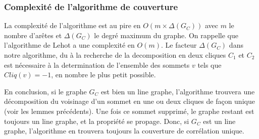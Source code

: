 \subsubsection{Complexit\'e de l'algorithme de couverture}
La complexit\'e de l'algorithme est au pire en $O(m \times \Delta(G_C))$ avec $m$ le nombre d'ar\^etes et $\Delta(G_C)$ le degr\'e maximum du graphe.
On rappelle que l'algorithme de Lehot \cite{decompositionEnCliques} a une complexit\'e en $O(m)$. 
Le facteur $\Delta(G_C)$ dans notre algorithme, du \`a la recherche de la decomposition en deux cliques $C_1$ et $C_2$ est n\'ecessaire \`a la determination de l'ensemble des sommets $v$ tels que $Cliq(v) = -1$, en nombre le plus petit possible.
\newline

En conclusion, si le graphe $G_C$ est bien un line graphe, l'algorithme trouvera une d\'ecomposition du voisinage d'un sommet en une ou deux cliques de fa\c con unique (voir les lemmes pr\'ec\'edents). 
Une fois ce sommet supprim\'e, le graphe restant est toujours un line graphe, et la propri\'et\'e se propage.
Donc, si $G_C$ est un line graphe, l'algorithme en trouvera toujours la couverture de corr\'elation unique.
